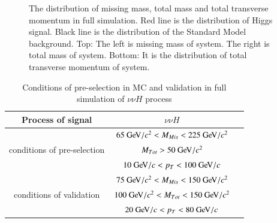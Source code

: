 \documentclass[11pt,a4paper]{cepcnote}
\begin{document}
\begin{figure}[H]
	\centering
	\caption[]{The distribution of missing mass, total mass and total transverse momentum in full simulation. 
	Red line is the distribution of Higgs signal. Black line is the distribution of the Standard Model background.
	Top: The left is missing mass of system. The right is total mass of system.
	Bottom: It is the distribution of total transverse momentum of system.}
	\label{fig:nnHfiltered}
\end{figure}
\begin{table}[H]
  \begin{center}
  \begin{tabular}{|c|c|c|}
  \hline \hline
  Process of signal								&				$\nu\nu H$\\
  \hline
  \multirow{3}{*}{conditions of pre-selection}	&	$65\gev/c^2 < M_{Mis} < 225\gev/c^2$	\\
  												&	$M_{Tot} > 50\gev/c^2$\\
												&	$10\gev/c < p_{T} < 100\gev/c$	\\
  \hline
  \multirow{3}{*}{conditions of validation}		&	$75\gev/c^2 < M_{Mis} < 150\gev/c^2$	\\
  												&	$100\gev/c^2 < M_{Tot} < 150\gev/c^2$	\\
												&	$20\gev/c < p_{T} < 80\gev/c$	\\
  \hline \hline
  \end{tabular}
  \caption[]{Conditions of pre-selection in MC and validation in full simulation of $\nu\nu H$ process}
  \label{tab:nnhprecut}
 \end{center}
\end{table}
\end{document}
